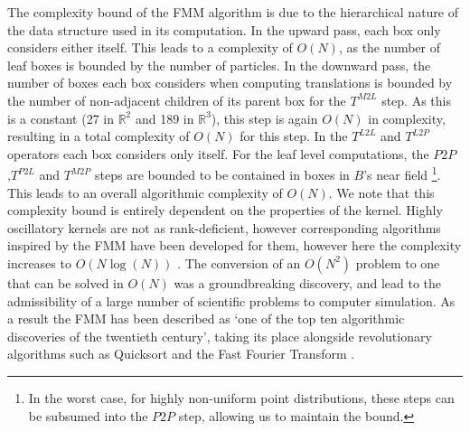 The complexity bound of the FMM algorithm is due to the hierarchical nature of the data structure used in its computation. In the upward pass, each box only considers either itself. This leads to a complexity of $O(N)$, as the number of leaf boxes is bounded by the number of particles. In the downward pass, the number of boxes each box considers when computing translations is bounded by the number of non-adjacent children of its parent box for the $T^{M2L}$ step. As this is a constant (27 in $\mathbb{R}^2$ and 189 in $\mathbb{R}^3$), this step is again $O(N)$ in complexity, resulting in a total complexity of $O(N)$ for this step. In the $T^{L2L}$ and $T^{L2P}$ operators each box considers only itself. For the leaf level computations, the $P2P$ ,$T^{P2L}$ and $T^{M2P}$ steps are bounded to be contained in boxes in $B$'s near field \footnote{In the worst case, for highly non-uniform point distributions, these steps can be subsumed into the $P2P$ step, allowing us to maintain the bound.}. This leads to an overall algorithmic complexity of $O(N)$. We note that this complexity bound is entirely dependent on the properties of the kernel. Highly oscillatory kernels are not as rank-deficient, however corresponding algorithms inspired by the FMM have been developed for them, however here the complexity increases to $O(N \log (N) )$ \cite{messner2012fast}. The conversion of an $O(N^2)$ problem to one that can be solved in $O(N)$ was a groundbreaking discovery, and lead to the admissibility of a large number of scientific problems to computer simulation. As a result the FMM has been described as `one of the top ten algorithmic discoveries of the twentieth century', taking its place alongside revolutionary algorithms such as Quicksort and the Fast Fourier Transform \cite{cipra2000best}.